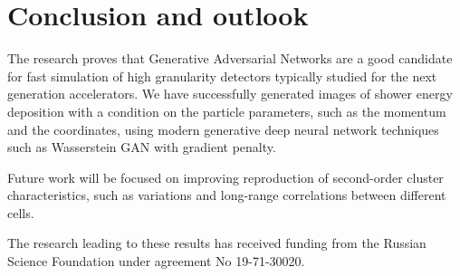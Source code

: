 \section{Conclusion and outlook}\label{conclusion}

The research proves that Generative Adversarial Networks are a good candidate for fast simulation of high granularity detectors typically studied for the next generation accelerators. We have successfully generated images of shower energy deposition with a condition on the particle parameters, such as the momentum and the coordinates, using modern generative deep neural network techniques such as Wasserstein GAN with gradient penalty.

Future work will be focused on improving reproduction of second-order cluster characteristics, such as variations and long-range correlations between different cells.

The research leading to these results has received funding from the Russian Science Foundation under agreement No 19-71-30020. 
